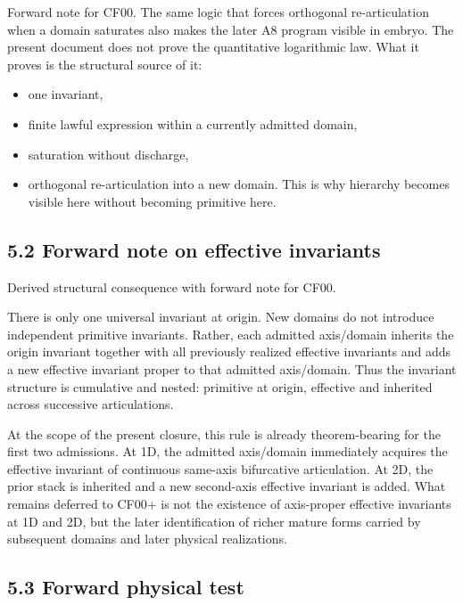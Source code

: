 \documentclass[11pt]{article}
\begin{document}
Forward note for CF00. The same logic that forces orthogonal re-articulation when a domain saturates also makes the later A8 program visible in embryo. The present document does not prove the quantitative logarithmic law. What it proves is the structural source of it:

\begin{itemize}
\item
  one invariant,
\item
  finite lawful expression within a currently admitted domain,
\item
  saturation without discharge,
\item
  orthogonal re-articulation into a new domain. This is why hierarchy becomes visible here without becoming primitive here.
\end{itemize}

\subsection{5.2 Forward note on effective invariants}\label{forward-note-on-effective-invariants}

Derived structural consequence with forward note for CF00.

There is only one universal invariant at origin. New domains do not introduce independent primitive invariants. Rather, each admitted axis/domain inherits the origin invariant together with all previously realized effective invariants and adds a new effective invariant proper to that admitted axis/domain. Thus the invariant structure is cumulative and nested: primitive at origin, effective and inherited across successive articulations.

At the scope of the present closure, this rule is already theorem-bearing for the first two admissions. At 1D, the admitted axis/domain immediately acquires the effective invariant of continuous same-axis bifurcative articulation. At 2D, the prior stack is inherited and a new second-axis effective invariant is added. What remains deferred to CF00+ is not the existence of axis-proper effective invariants at 1D and 2D, but the later identification of richer mature forms carried by subsequent domains and later physical realizations.

\subsection{5.3 Forward physical test}\label{forward-physical-test}
\end{document}
